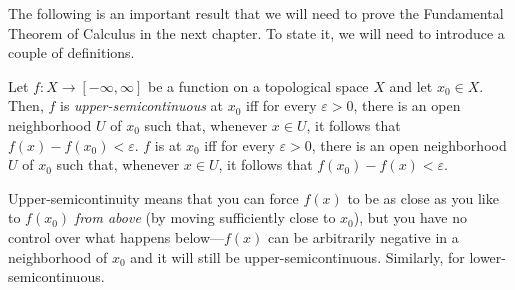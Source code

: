The following is an important result that we will need to prove the Fundamental Theorem of Calculus in the next chapter.  To state it, we will need to introduce a couple of definitions.
\begin{dfn}\label{Semicontinuity}
Let $f:X\rightarrow [-\infty ,\infty ]$ be a function on a topological space $X$ and let $x_0\in X$.  Then, $f$ is \emph{upper-semicontinuous} at $x_0$ iff for every $\varepsilon >0$, there is an open neighborhood $U$ of $x_0$ such that, whenever $x\in U$, it follows that $f(x)-f(x_0)<\varepsilon$.  $f$ is  at $x_0$ iff for every $\varepsilon >0$, there is an open neighborhood $U$ of $x_0$ such that, whenever $x\in U$, it follows that $f(x_0)-f(x)<\varepsilon $.
\begin{rmk}
Upper-semicontinuity means that you can force $f(x)$ to be as close as you like to $f(x_0)$ \emph{from above} (by moving sufficiently close to $x_0$), but you have no control over what happens below---$f(x)$ can be arbitrarily negative in a neighborhood of $x_0$ and it will still be upper-semicontinuous.  Similarly, for lower-semicontinuous.
\end{rmk}
\end{dfn}
